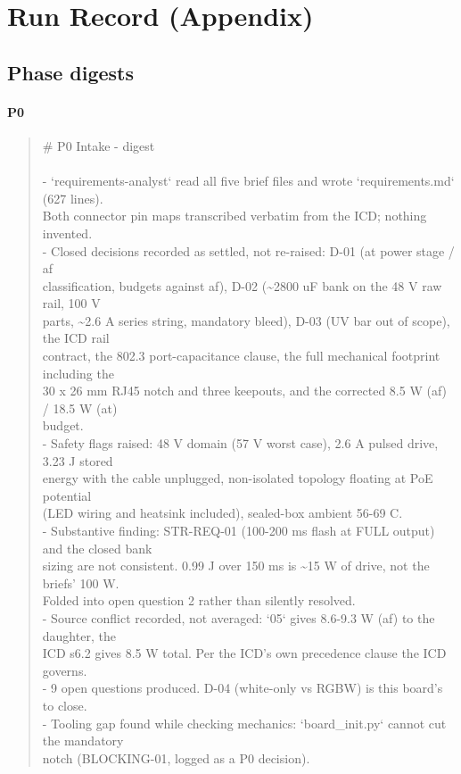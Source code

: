 \documentclass[11pt,a4paper]{article}
\begin{document}
\section{Run Record (Appendix)}
\subsection*{Phase digests}
\paragraph*{P0}
\begin{quote}\small\ttfamily\raggedright
\# P0 Intake - digest\\
~\\
- `requirements-analyst` read all five brief files and wrote `requirements.md` (627 lines).\\
  Both connector pin maps transcribed verbatim from the ICD; nothing invented.\\
- Closed decisions recorded as settled, not re-raised: D-01 (at power stage / af\\
  classification, budgets against af), D-02 (\textasciitilde{}2800 uF bank on the 48 V raw rail, 100 V\\
  parts, \textasciitilde{}2.6 A series string, mandatory bleed), D-03 (UV bar out of scope), the ICD rail\\
  contract, the 802.3 port-capacitance clause, the full mechanical footprint including the\\
  30 x 26 mm RJ45 notch and three keepouts, and the corrected 8.5 W (af) / 18.5 W (at)\\
  budget.\\
- Safety flags raised: 48 V domain (57 V worst case), 2.6 A pulsed drive, 3.23 J stored\\
  energy with the cable unplugged, non-isolated topology floating at PoE potential\\
  (LED wiring and heatsink included), sealed-box ambient 56-69 C.\\
- Substantive finding: STR-REQ-01 (100-200 ms flash at FULL output) and the closed bank\\
  sizing are not consistent. 0.99 J over 150 ms is \textasciitilde{}15 W of drive, not the briefs' 100 W.\\
  Folded into open question 2 rather than silently resolved.\\
- Source conflict recorded, not averaged: `05` gives 8.6-9.3 W (af) to the daughter, the\\
  ICD s6.2 gives 8.5 W total. Per the ICD's own precedence clause the ICD governs.\\
- 9 open questions produced. D-04 (white-only vs RGBW) is this board's to close.\\
- Tooling gap found while checking mechanics: `board\_init.py` cannot cut the mandatory\\
  notch (BLOCKING-01, logged as a P0 decision).
\end{quote}
\end{document}
